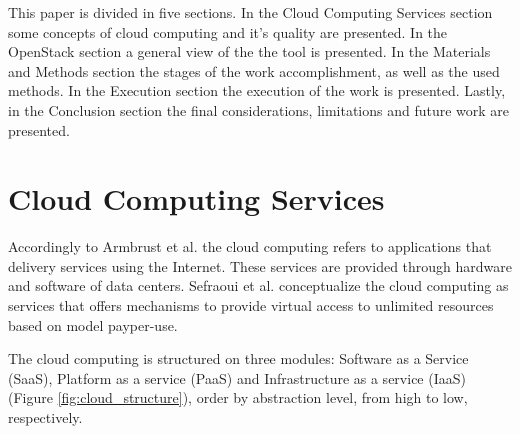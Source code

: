 \documentclass[conference]{IEEEtran}
\begin{document}
This paper is divided in five sections.
In the Cloud Computing Services section some concepts of cloud computing and it's quality are presented.
In the OpenStack section a general view of the the tool is presented.
In the Materials and Methods section the stages of the work accomplishment, as well as the used methods.
In the Execution section the execution of the work is presented.
Lastly, in the Conclusion section the final considerations, limitations and future work are presented.

\section{Cloud Computing Services}

Accordingly to Armbrust et al. \cite{armbrust2010view} the cloud computing refers to applications that delivery services 
using the Internet. These services are provided through hardware and software of data centers. Sefraoui et al. conceptualize the 
cloud computing as services that offers mechanisms to provide virtual access to unlimited resources based on model payper-use.


The cloud computing is structured on three modules: Software as a Service (SaaS), Platform as a service (PaaS) and Infrastructure as a service (IaaS) (Figure \ref{fig:cloud_structure}), order by abstraction level, from high to low, respectively. 
\end{document}

